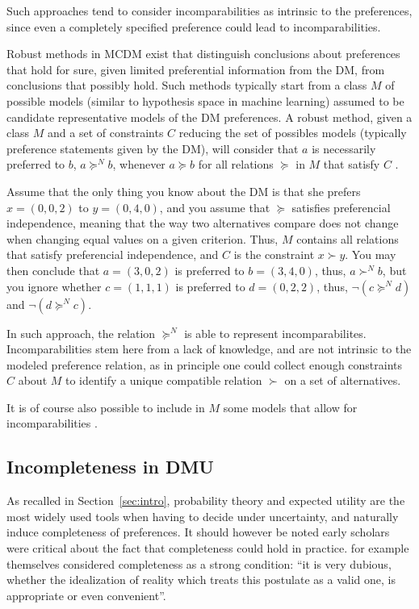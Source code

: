\documentclass[french, english]{llncs}
\begin{document}
Such approaches tend to consider incomparabilities as intrinsic to the preferences, since even a completely specified preference could lead to incomparabilities. 

Robust methods in MCDM exist that distinguish conclusions about preferences that hold for sure, given limited preferential information from the \ac{DM}, from conclusions that possibly hold. Such methods typically start from a class $M$ of possible models (similar to hypothesis space in machine learning) assumed to be candidate representative models of the \ac{DM} preferences. A robust method, given a class $M$ and a set of constraints $C$ reducing the set of possibles models (typically preference statements given by the \ac{DM}), will consider that $a$ is necessarily preferred to $b$, $a \succeq^N b$, whenever $a \succeq b$ for all relations $\succeq$ in $M$ that satisfy $C$ \citep{greco_ordinal_2008}.
\begin{example} 
Assume that the only thing you know about the \ac{DM} is that she prefers $x = (0, 0, 2)$ to $y = (0, 4, 0)$, and you assume that $\succeq$ satisfies preferencial independence, meaning that the way two alternatives compare does not change when changing equal values on a given criterion. Thus, $M$ contains all relations that satisfy preferencial independence, and $C$ is the constraint $x \succ y$. You may then conclude that $a = (3, 0, 2)$ is preferred to $b = (3, 4, 0)$, thus, $a \succ^N b$, but you ignore whether $c = (1, 1, 1)$ is preferred to $d = (0, 2, 2)$, thus, $¬(c \succeq^N d)$ and $¬(d \succeq^N c)$.
\end{example} 
In such approach, the relation $\succeq^N$ is able to represent incomparabilites. Incomparabilities stem here from a lack of knowledge, and are not intrinsic to the modeled preference relation, as in principle one could collect enough constraints $C$ about $M$ to identify a unique compatible relation $\succ$ on a set of alternatives.

It is of course also possible to include in $M$ some models that allow for incomparabilities \citep{greco_electregkms:_2011}.

	\subsection{Incompleteness in DMU}
	
	As recalled in Section~\ref{sec:intro}, probability theory and expected utility are the most widely used tools when having to decide under uncertainty, and naturally induce completeness of preferences. It should however be noted early scholars were critical about the fact that completeness could hold in practice. 
\citet[p. 630]{von_neumann_theory_1953} for example themselves considered completeness as a strong condition: “it is very dubious, whether the idealization of reality which treats this postulate as a valid one, is appropriate or even convenient”.
\end{document}

